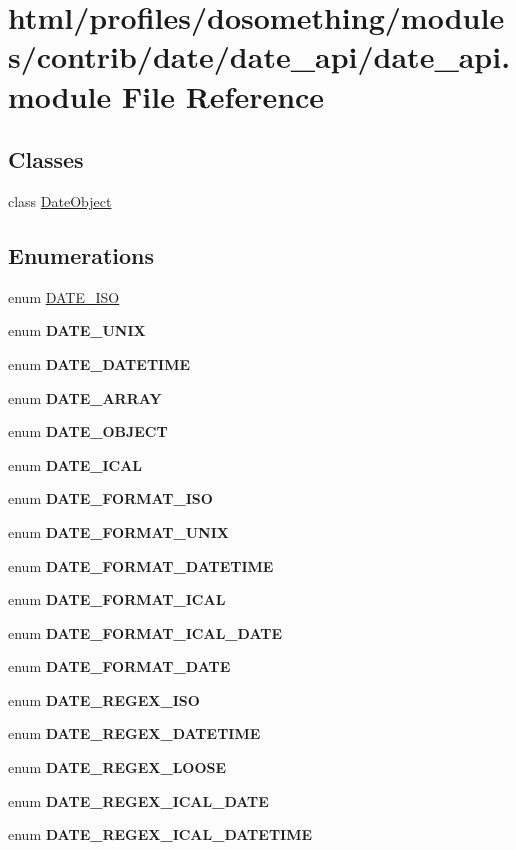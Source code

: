 \hypertarget{date__api_8module}{
\section{html/profiles/dosomething/modules/contrib/date/date\_\-api/date\_\-api.module File Reference}
\label{date__api_8module}
}
\subsection*{Classes}
\begin{DoxyCompactItemize}
\item 
class \hyperlink{classDateObject}{DateObject}
\end{DoxyCompactItemize}
\subsection*{Enumerations}
\begin{DoxyCompactItemize}
\item 
enum \hyperlink{date__api_8module_a88a1cfe07f4c4957d11cf7860a95b21a}{DATE\_\-ISO} 
\item 
enum {\bfseries DATE\_\-UNIX} 
\item 
enum {\bfseries DATE\_\-DATETIME} 
\item 
enum {\bfseries DATE\_\-ARRAY} 
\item 
enum {\bfseries DATE\_\-OBJECT} 
\item 
enum {\bfseries DATE\_\-ICAL} 
\item 
enum {\bfseries DATE\_\-FORMAT\_\-ISO} 
\item 
enum {\bfseries DATE\_\-FORMAT\_\-UNIX} 
\item 
enum {\bfseries DATE\_\-FORMAT\_\-DATETIME} 
\item 
enum {\bfseries DATE\_\-FORMAT\_\-ICAL} 
\item 
enum {\bfseries DATE\_\-FORMAT\_\-ICAL\_\-DATE} 
\item 
enum {\bfseries DATE\_\-FORMAT\_\-DATE} 
\item 
enum {\bfseries DATE\_\-REGEX\_\-ISO} 
\item 
enum {\bfseries DATE\_\-REGEX\_\-DATETIME} 
\item 
enum {\bfseries DATE\_\-REGEX\_\-LOOSE} 
\item 
enum {\bfseries DATE\_\-REGEX\_\-ICAL\_\-DATE} 
\item 
enum {\bfseries DATE\_\-REGEX\_\-ICAL\_\-DATETIME} 
\end{DoxyCompactItemize}
